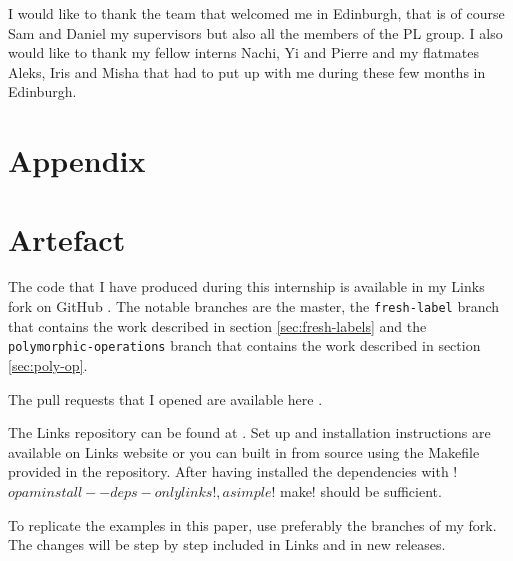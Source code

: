 \documentclass[11pt, nonacm=true, language=french, language=english]{acmart}
\begin{document}
I would like to thank the team that welcomed me in Edinburgh, that is of course Sam and Daniel my supervisors but also all the members of the PL group. I also would like to thank my fellow interns Nachi, Yi and Pierre and my flatmates Aleks, Iris and Misha that had to put up with me during these few months in Edinburgh.

























\newpage

\appendix

\section*{Appendix}

\section{Artefact}
\label{sec:code-production}

The code that I have produced during this internship is available in my Links fork on GitHub \cite{gh:mylinks}. The notable branches are the master, the \texttt{fresh-label} branch that contains the work described in section \ref{sec:fresh-labels} and the \texttt{polymorphic-operations} branch that contains the work described in section \ref{sec:poly-op}.

The pull requests that I opened are available here \cite{gh:prs}.

The Links repository can be found at \cite{gh:links}. Set up and installation instructions are available on Links website \cite{links-org} or you can built in from source using the Makefile provided in the repository. After having installed the dependencies with !$ opam install --deps-only links!, a simple !$ make! should be sufficient.

To replicate the examples in this paper, use preferably the branches of my fork. The changes will be step by step included in Links and in new releases.

\end{document}
